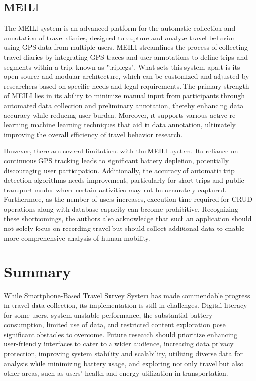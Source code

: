 \documentclass[12pt,two side]{report}
\begin{document}
\subsection{MEILI}
The MEILI system is an advanced platform for the automatic collection and annotation of travel diaries, designed to capture and analyze travel behavior using GPS data from multiple users. MEILI streamlines the process of collecting travel diaries by integrating GPS traces and user annotations to define trips and segments within a trip, known as "triplegs". What sets this system apart is its open-source and modular architecture, which can be customized and adjusted by researchers based on specific needs and legal requirements. The primary strength of MEILI lies in its ability to minimize manual input from participants through automated data collection and preliminary annotation, thereby enhancing data accuracy while reducing user burden. Moreover, it supports various active re-learning machine learning techniques that aid in data annotation, ultimately improving the overall efficiency of travel behavior research.\newline

However, there are several limitations with the MEILI system. Its reliance on continuous GPS tracking leads to significant battery depletion, potentially discouraging user participation. Additionally, the accuracy of automatic trip detection algorithms needs improvement, particularly for short trips and public transport modes where certain activities may not be accurately captured. Furthermore, as the number of users increases, execution time required for CRUD operations along with database capacity can become prohibitive. Recognizing these shortcomings, the authors also acknowledge that such an application should not solely focus on recording travel but should collect additional data to enable more comprehensive analysis of human mobility.
\section{Summary}
While Smartphone-Based Travel Survey System has made commendable progress in travel data collection, its implementation is still in challenges. Digital literacy for some users, system unstable performance, the substantial battery consumption, limited use of data, and restricted content exploration pose significant obstacles to overcome. Future research should prioritize enhancing user-friendly interfaces to cater to a wider audience, increasing data privacy protection, improving system stability and scalability, utilizing diverse data for analysis while minimizing battery usage, and exploring not only travel but also other areas, such as users' health and energy utilization in transportation.
\end{document}
